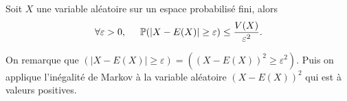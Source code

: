 \begin{prop}
 Soit $X$ une variable aléatoire sur un espace probabilisé fini, alors
\begin{displaymath}
 \forall \varepsilon >0,\hspace{0.5cm}
\mathbb{P}(\left|X - E(X)\right|\geq \varepsilon) \leq \frac{V(X)}{\varepsilon^2}.
\end{displaymath}
\end{prop}
\begin{demo}
 On remarque que $\left( \left|X - E(X)\right|\geq \varepsilon\right) = \left( (X-E(X))^2\geq \varepsilon^2\right)$. Puis on applique l'inégalité de Markov à la variable aléatoire $(X-E(X))^2$ qui est à valeurs positives.  
\end{demo}

